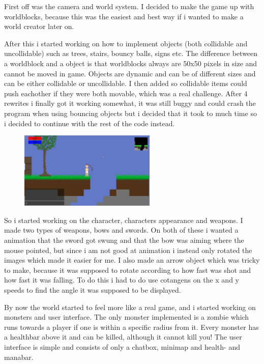 \documentclass[a4paper,12pt]{article}
\begin{document}
First off was the camera and world system. 
I decided to make the game up with worldblocks, because this was the easiest and best way if i wanted to make a world creator later on.

After this i started working on how to implement objects (both collidable and uncollidable) such as trees, stairs, bouncy balls, signs etc.
The difference between a worldblock and a object is that worldblocks always are 50x50 pixels in size and cannot be moved in game.
Objects are dynamic and can be of different sizes and can be either collidable or uncollidable. 
I then added so collidable items could push eachother if they were both movable, which was a real challenge.
After 4 rewrites i finally got it working somewhat, it was still buggy and could crash the program when using bouncing objects but i decided that it took to much time so i decided to continue with the rest of the code instead.

\begin{figure}
    \vspace{-20pt}
    \begin{center}
        \includegraphics[width=0.58\textwidth]{img/screenshot2.eps}
    \end{center}
    \vspace{-20pt}
\end{figure}
So i started working on the character, characters appearance and weapons.
I made two types of weapons, bows and swords.
On both of these i wanted a animation that the sword got swung and that the bow was aiming where the mouse pointed, but since i am not good at animation i instead only rotated the images which made it easier for me.
I also made an arrow object which was tricky to make, because it was supposed to rotate according to how fast was shot and how fast it was falling. 
To do this i had to do use cotangens on the x and y speeds to find the angle it was supposed to be displayed.


By now the world started to feel more like a real game, and i started working on monsters and user interface.
The only monster implemented is a zombie which runs towards a player if one is within a specific radius from it.
Every monster has a healthbar above it and can be killed, although it cannot kill you!
The user interface is simple and consists of only a chatbox, minimap and health- and manabar.
\\
\end{document}
